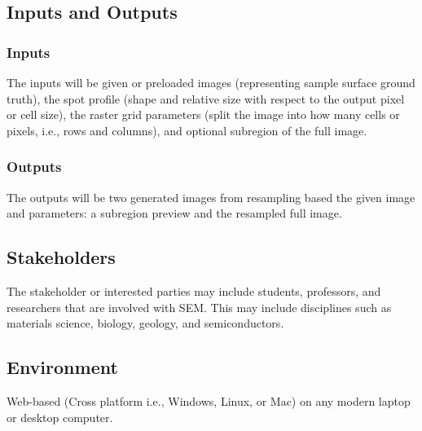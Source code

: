 \documentclass{article}
\begin{document}
\subsection{Inputs and Outputs}
\subsubsection{Inputs}
The inputs will be given or preloaded images (representing sample surface
ground truth), the spot profile (shape and relative size with respect to the
output pixel or cell size), the raster grid parameters (split the image into how
many cells or pixels, i.e., rows and columns), and optional subregion of the
full image.
\subsubsection{Outputs} The outputs will be two generated images
from resampling based the given image and parameters: a subregion preview and
the resampled full image.

\subsection{Stakeholders}
The stakeholder or interested parties may include
students, professors, and researchers that are involved with SEM. This may
include disciplines such as materials science, biology, geology, and
semiconductors.

\subsection{Environment}
Web-based (Cross platform i.e., Windows, Linux, or Mac)
on any modern laptop or desktop computer.
\end{document}
